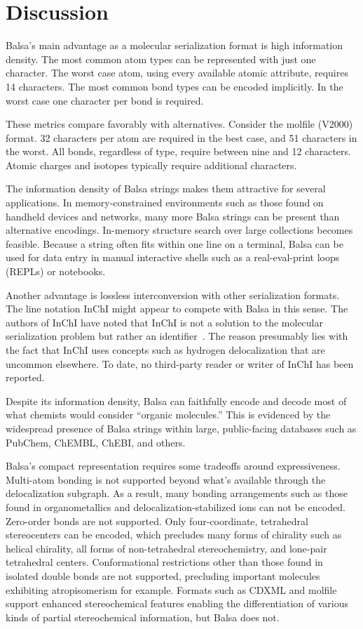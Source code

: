 \documentclass{article}
\begin{document}
\section*{Discussion}

Balsa's main advantage as a molecular serialization format is high information density. The most common atom types can be represented with just one character. The worst case atom, using every available atomic attribute, requires 14 characters. The most common bond types can be encoded implicitly. In the worst case one character per bond is required.

These metrics compare favorably with alternatives. Consider the molfile (V2000) format. 32 characters per atom are required in the best case, and 51 characters in the worst. All bonds, regardless of type, require between nine and 12 characters. Atomic charges and isotopes typically require additional characters.

The information density of Balsa strings makes them attractive for several applications. In memory-constrained environments such as those found on handheld devices and networks, many more Balsa strings can be present than alternative encodings. In-memory structure search over large collections becomes feasible. Because a string often fits within one line on a terminal, Balsa can be used for data entry in manual interactive shells such as a real-eval-print loops (REPLs) or notebooks.

Another advantage is lossless interconversion with other serialization formats. The line notation InChI might appear to compete with Balsa in this sense. The authors of InChI have noted that InChI is not a solution to the molecular serialization problem but rather an identifier~\cite{heller:2015}. The reason presumably lies with the fact that InChI uses concepts such as hydrogen delocalization that are uncommon elsewhere. To date, no third-party reader or writer of InChI has been reported.

Despite its information density, Balsa can faithfully encode and decode most of what chemists would consider \enquote{organic molecules.} This is evidenced by the widespread presence of Balsa strings within large, public-facing databases such as PubChem,\cite{kim:2016} ChEMBL,\cite{gaulton:2012} ChEBI,\cite{degtyarenko:2007} and others.

Balsa's compact representation requires some tradeoffs around expressiveness. Multi-atom bonding is not supported beyond what's available through the delocalization subgraph. As a result, many bonding arrangements such as those found in organometallics and delocalization-\-stabilized ions can not be encoded. Zero-\-order bonds are not supported. Only four-\-coordinate, tetrahedral stereocenters can be encoded, which precludes many forms of chirality such as helical chirality, all forms of non-\-tetrahedral stereochemistry, and lone-\-pair tetrahedral centers. Conformational restrictions other than those found in isolated double bonds are not supported, precluding important molecules exhibiting atropisomerism for example. Formats such as CDXML and molfile support enhanced stereochemical features enabling the differentiation of various kinds of partial stereochemical information, but Balsa does not.
\end{document}
